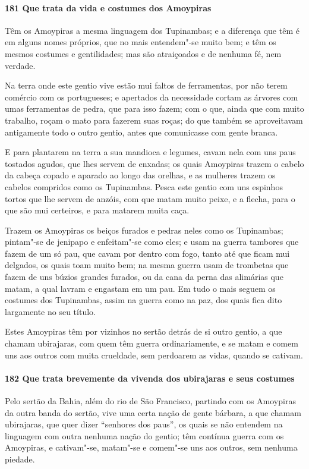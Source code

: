\begin{linenumbers}
\paragraph{181 Que trata da vida e costumes dos Amoypiras}\quad
Têm os Amoypiras a mesma linguagem dos Tupinambas; e a diferença que têm é em alguns nomes
próprios, que no mais entendem"-se muito bem; e têm os mesmos costumes e gentilidades; mas
são atraiçoados e de nenhuma fé, nem verdade.

Na terra onde este gentio vive estão mui faltos de ferramentas, por não terem comércio com
os portugueses; e apertados da necessidade cortam as árvores com umas ferramentas de
pedra, que para isso fazem; com o que, ainda que com muito trabalho, roçam o mato para
fazerem suas roças; do que também se aproveitavam antigamente todo o outro gentio, antes
que comunicasse com gente branca.

E para plantarem na terra a sua mandioca e legumes, cavam nela com uns paus tostados
agudos, que lhes servem de enxadas; os quais Amoypiras trazem o cabelo da cabeça copado e
aparado ao longo das orelhas, e as mulheres trazem os cabelos compridos como os
Tupinambas. Pesca este gentio com uns espinhos tortos que lhe servem de anzóis, com que
matam muito peixe, e a flecha, para o que são mui certeiros, e para matarem muita caça.

Trazem os Amoypiras os beiços furados e pedras neles como os Tupinambas; pintam"-se de
jenipapo e enfeitam"-se como eles; e usam na guerra tambores que fazem de um só pau, que
cavam por dentro com fogo, tanto até que ficam mui delgados, os quais toam muito bem; na
mesma guerra usam de trombetas que fazem de uns búzios grandes furados, ou da cana da
perna das alimárias que matam, a qual lavram e engastam em um pau. Em tudo o mais seguem
os costumes dos Tupinambas, assim na guerra como na paz, dos quais fica dito largamente no
seu título.

Estes Amoypiras têm por vizinhos no sertão detrás de si outro gentio, a que chamam
ubirajaras, com quem têm guerra ordinariamente, e se matam e comem uns aos outros com
muita crueldade, sem perdoarem as vidas, quando se cativam.

\paragraph{182 Que trata brevemente da vivenda dos ubirajaras e seus costumes}\quad
Pelo sertão da Bahia, além do rio de São Francisco, partindo com os Amoypiras da outra
banda do sertão, vive uma certa nação de gente bárbara, a que chamam ubirajaras, que quer
dizer ``senhores dos paus'', os quais se não entendem na linguagem com outra nenhuma nação
do gentio; têm contínua guerra com os Amoypiras, e cativam"-se, matam"-se e comem"-se uns aos
outros, sem nenhuma piedade.


\end{linenumbers}
